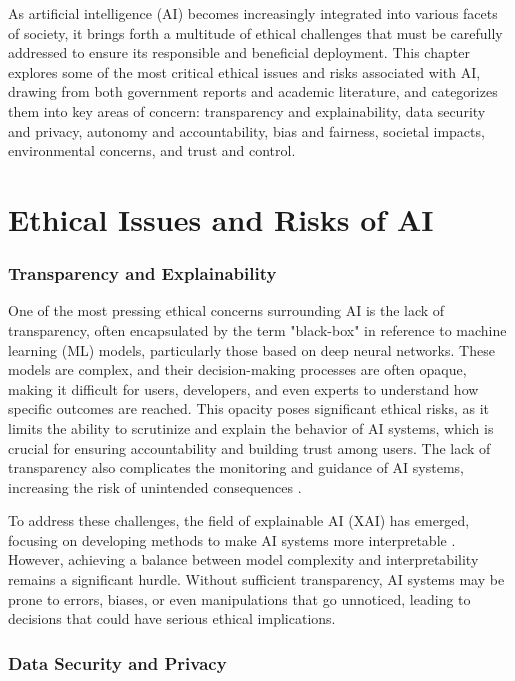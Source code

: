 As artificial intelligence (AI) becomes increasingly integrated into various facets of society, it brings forth a multitude of ethical challenges that must be carefully addressed to ensure its responsible and beneficial deployment. This chapter explores some of the most critical ethical issues and risks associated with AI, drawing from both government reports and academic literature, and categorizes them into key areas of concern: transparency and explainability, data security and privacy, autonomy and accountability, bias and fairness, societal impacts, environmental concerns, and trust and control.

\section{Ethical Issues and Risks of AI}


\subsubsection{Transparency and Explainability}

One of the most pressing ethical concerns surrounding AI is the lack of transparency, often encapsulated by the term "black-box" in reference to machine learning (ML) models, particularly those based on deep neural networks. These models are complex, and their decision-making processes are often opaque, making it difficult for users, developers, and even experts to understand how specific outcomes are reached. This opacity poses significant ethical risks, as it limits the ability to scrutinize and explain the behavior of AI systems, which is crucial for ensuring accountability and building trust among users. The lack of transparency also complicates the monitoring and guidance of AI systems, increasing the risk of unintended consequences \cite{huang2022overview}.

To address these challenges, the field of explainable AI (XAI) has emerged, focusing on developing methods to make AI systems more interpretable \cite{molnar2020interpretable}. However, achieving a balance between model complexity and interpretability remains a significant hurdle. Without sufficient transparency, AI systems may be prone to errors, biases, or even manipulations that go unnoticed, leading to decisions that could have serious ethical implications.

\subsubsection{Data Security and Privacy}

